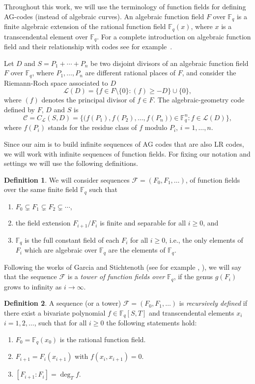 \documentclass{amsart}
\newcommand{\m}{\mathcal}
\newcommand{\F}{\mathbb{F}}
\theoremstyle{definition}
\newtheorem{defin}{Definition}
\begin{document}
 
Throughout this work, we will use the terminology of function fields for defining AG-codes (instead of algebraic curves).  An algebraic function field $F$ over $\F_q$ is a finite algebraic extension  of the rational function field $\F_q(x)$, where $x$ is a transcendental element over $\F_q$. For a complete introduction on  algebraic function field and their relationship with codes see for example~\cite{stichtenoth}.

Let $D$ and $S=P_1+\cdots +P_n$ be two disjoint divisors of an algebraic function field $F$ over $\F_q$, 
where $P_1,\ldots,P_n$ are different rational places of $F$, and consider the Riemann-Roch space associated to $D$
$$\m{L}(D) = \{f\in F \setminus \{0\} : (f) \geq -D\} \cup \{0\},$$
 where $(f)$ denotes the principal divisor of $f\in F$. The algebraic-geometry code
defined by $F$, $D$ and $S$ is
$$\m{C} = C_{\m{L}}(S,D) = \big \{ \big( f(P_1),f(P_2),\ldots, f(P_n) \big) \in \F_q^n : f\in \m{L}(D) \big\},$$
where $f(P_i)$ stands for the residue class of $f$ modulo $P_i$, $i=1,\dots, n$. 
 

Since our  aim is to build infinite sequences of AG codes that are also LR codes, we will work with infinite sequences of function fields. For fixing our notation and settings we will use the following definitions.

\begin{defin}
	 We will consider sequences $\m{F}=(F_0, F_1, \ldots)$, of function fields over the same finite field $\F_q$ such that
	\begin{enumerate}[1.]
		\item $F_0\subsetneq F_1 \subsetneq F_2 \subsetneq \cdots$,
		\item the field extension $F_{i+1}/F_i$ is finite and separable for all $i\geq 0$, and
		\item $\F_q$ is the full constant field of each $F_i$ for all $i\geq 0$, i.e., the only elements of $F_i$ which are algebraic over $\F_q$ are the elements of $\F_q$.
	\end{enumerate}
Following the works of Garcia and Stichtenoth (see for example \cite{GS}, \cite{stichtenoth}), we will say that the sequence $\m{F}$ is a \emph{tower of function fields over} $\F_q$, if the genus $g(F_i)$ grows to infinity as $i\rightarrow \infty$.
\end{defin}

\begin{defin}
A sequence (or a tower) $\m{F}=(F_0, F_1, \ldots)$ is \emph{recursively defined} if there exist a bivariate polynomial $f\in \F_q[S,T]$ and transcendental elements $x_i$ $i=1,2,\ldots$, such that for all $i\geq0$ the following statements hold:
\begin{enumerate}[1.]
\item $F_0=\F_q(x_0)$ is the rational function field.
\item $F_{i+1}=F_i(x_{i+1})$ with $f(x_i, x_{i+1})=0$.
\item $[F_{i+1}:F_i]=\deg_{T}f$.
\end{enumerate}
\end{defin}
\end{document}
